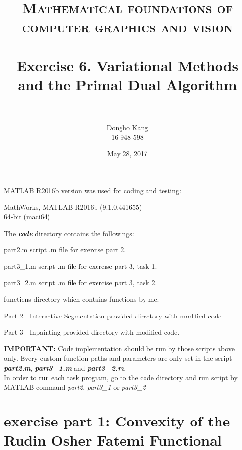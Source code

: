 \documentclass[paper=a4, fontsize=11pt]{scrartcl} %
\title{	
\normalfont \normalsize 
\textsc{Mathematical foundations of computer graphics and vision} \\ [25pt] %
\horrule{0.5pt} \\[0.4cm] %
\huge Exercise 6. Variational Methods and the Primal Dual Algorithm\\ %
\horrule{2pt} \\[0.5cm] %
}
\author{Dongho Kang \\ \small 16-948-598} %
\date{\normalsize May 28, 2017} %
\numberwithin{equation}{section} %
\numberwithin{figure}{section} %
\numberwithin{table}{section} %
\newcommand{\filename}[1]{\textbf{\textit{#1}}}
\begin{document}
\maketitle %


MATLAB R2016b version was used for coding and testing:

\begin{center}
MathWorks, MATLAB R2016b (9.1.0.441655) \\
64-bit (maci64) 
\end{center}

The \filename{code} directory contains the followings:

\begin{filedescription}
	\item [part2.m] script .m file for exercise part 2.
	\item [part3\_1.m] script .m file for exercise part 3, task 1.
	\item [part3\_2.m] script .m file for exercise part 3, task 2.
	\item [functions] directory which contains functions by me. 
	\item [Part 2 - Interactive Segmentation] provided directory with modified code.
	\item [Part 3 - Inpainting] provided directory with modified code.
\end{filedescription} 

\textbf{IMPORTANT:} Code implementation should be run by those scripts above only. Every custom function paths and parameters are only set in the script \filename{part2.m}, \filename{part3\_1.m} and \filename{part3\_2.m}. \\ 

In order to run each task program, go to the code directory and run script by MATLAB command \textit{part2}, \textit{part3\_1} or \textit{part3\_2}

\pagebreak


\section{exercise part 1: Convexity of the Rudin Osher Fatemi Functional}
\end{document}
